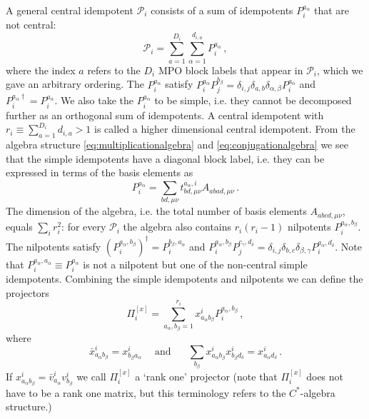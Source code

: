 \documentclass[12 pt]{article}
\begin{document}
A general central idempotent $\mathcal{P}_i$ consists of a sum of idempotents $P^{a_\alpha}_i$ that are not central:
\begin{equation}\label{eq:centralidempotentdecomposition}
\mathcal{P}_i = \sum_{a=1}^{D_i}\sum_{\alpha = 1}^{d_{i,a}} P^{a_\alpha}_i\, ,
\end{equation}
where the index $a$ refers to the $D_i$ MPO block labels that appear in $\mathcal{P}_i$, which we gave an arbitrary ordering. The $P^{a_\alpha}_i$ satisfy $P^{a_\alpha}_iP^{b_\beta}_j = \delta_{i,j}\delta_{a,b}\delta_{\alpha,\beta}P^{a_\alpha}_i$ and $P^{a_\alpha\dagger}_i = P_i^{a_\alpha}$. We also take the $P_i^{a_\alpha}$ to be simple, i.e. they cannot be decomposed further as an orthogonal sum of idempotents. A central idempotent with $r_i \equiv \sum_{a=1}^{D_i}d_{i,a} > 1$ is called a higher dimensional central idempotent. From the algebra structure \eqref{eq:multiplicationalgebra} and \eqref{eq:conjugationalgebra} we see that the simple idempotents have a diagonal block label, i.e. they can be expressed in terms of the basis elements as
\begin{equation}
P^{a_\alpha}_i = \sum_{bd,\mu\nu} t^{a_\alpha,i}_{bd,\mu\nu}A_{abad,\mu\nu}\, .
\end{equation}
The dimension of the algebra, i.e. the total number of basis elements $A_{abcd,\mu\nu}$, equals $\sum_i r_i^2$: for every $\mathcal{P}_i$ the algebra also contains $r_i(r_i - 1)$ nilpotents $P^{a_\alpha,b_\beta}_i$. The nilpotents satisfy $\left(P_i^{a_\alpha,b_\beta}\right)^\dagger = P_i^{b_\beta,a_\alpha}$ and $P_i^{a_\alpha,b_\beta}P_j^{c_\gamma,d_\delta} = \delta_{i,j} \delta_{b,c}\delta_{\beta,\gamma}P_i^{a_\alpha,d_\delta}$. Note that $P^{a_\alpha,a_\alpha}_i \equiv P^{a_\alpha}_i$ is not a nilpotent but one of the non-central simple idempotents. Combining the simple idempotents and nilpotents we can define the projectors
\begin{equation}
\Pi_i^{[x]} = \sum_{a_\alpha,b_\beta = 1}^{r_i}  x^i_{a_\alpha b_\beta} P_i^{a_\alpha,b_\beta}\, ,
\end{equation}
where
\begin{equation}
\bar{x}^i_{a_\alpha b_\beta} = x^i_{b_\beta a_\alpha}\,\;\;\;\;\text{and }\;\;\;\;\; \sum_{b_\beta} x^i_{a_\alpha b_\beta}x^i_{b_\beta d_\delta} = x^i_{a_\alpha d_\delta}\, .
\end{equation}
If $x^i_{a_\alpha b_\beta} = \bar{v}^i_{a_\alpha}v^i_{b_\beta}$ we call $\Pi^{[x]}_i$ a `rank one' projector (note that $\Pi_i^{[x]}$ does not have to be a rank one matrix, but this terminology refers to the $C^*$-algebra structure.)
\end{document}
